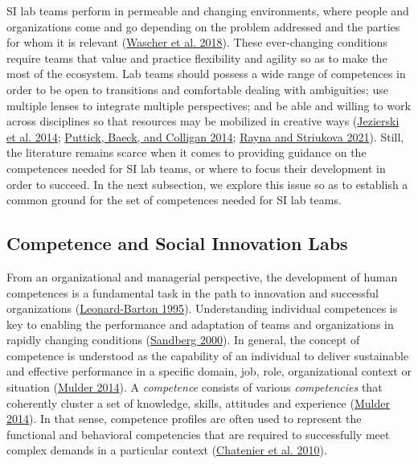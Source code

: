 \documentclass[AMA,STIX1COL,APA,STIX2COL]{WileyNJD-v2}
\begin{document}
SI lab teams perform in permeable and changing environments, where
people and organizations come and go depending on the problem addressed
and the parties for whom it is relevant
(\protect\hyperlink{ref-Wascher2018}{Wascher et al. 2018}). These
ever-changing conditions require teams that value and practice
flexibility and agility so as to make the most of the ecosystem. Lab
teams should possess a wide range of competences in order to be open to
transitions and comfortable dealing with ambiguities; use multiple
lenses to integrate multiple perspectives; and be able and willing to
work across disciplines so that resources may be mobilized in creative
ways (\protect\hyperlink{ref-Jezierski2014}{Jezierski et al. 2014};
\protect\hyperlink{ref-Puttick2014-Teams}{Puttick, Baeck, and Colligan
2014}; \protect\hyperlink{ref-Rayna2021}{Rayna and Striukova 2021}).
Still, the literature remains scarce when it comes to providing guidance
on the competences needed for SI lab teams, or where to focus their
development in order to succeed. In the next subsection, we explore this
issue so as to establish a common ground for the set of competences
needed for SI lab teams.

\hypertarget{competence-and-social-innovation-labs}{%
\subsection{Competence and Social Innovation
Labs}\label{competence-and-social-innovation-labs}}

From an organizational and managerial perspective, the development of
human competences is a fundamental task in the path to innovation and
successful organizations
(\protect\hyperlink{ref-Leonard1995}{Leonard-Barton 1995}).
Understanding individual competences is key to enabling the performance
and adaptation of teams and organizations in rapidly changing conditions
(\protect\hyperlink{ref-Sandberg2000}{Sandberg 2000}). In general, the
concept of competence is understood as the capability of an individual
to deliver sustainable and effective performance in a specific domain,
job, role, organizational context or situation
(\protect\hyperlink{ref-Mulder2014}{Mulder 2014}). A \emph{competence}
consists of various \emph{competencies} that coherently cluster a set of
knowledge, skills, attitudes and experience
(\protect\hyperlink{ref-Mulder2014}{Mulder 2014}). In that sense,
competence profiles are often used to represent the functional and
behavioral competencies that are required to successfully meet complex
demands in a particular context
(\protect\hyperlink{ref-Chatenier2010}{Chatenier et al. 2010}).
\end{document}
